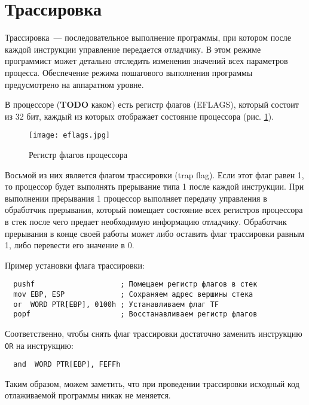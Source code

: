 
\section{Трассировка}
Трассировка~--- последовательное выполнение программы, при котором после каждой
инструкции управление передается отладчику. В этом режиме программист может
детально отследить изменения значений всех параметров процесса. Обеспечение
режима пошагового выполнения программы предусмотрено на аппаратном уровне.

В процессоре (\textbf{TODO} каком) есть регистр флагов (EFLAGS), который состоит
из 32 бит, каждый из которых отображает состояние процессора (рис.
\ref{fig:eflags}).
\begin{figure}[htpb]
  \centering
  \texttt{[image: eflags.jpg]}
  \caption{Регистр флагов процессора}
  \label{fig:eflags}
\end{figure}

Восьмой из них является флагом трассировки (trap flag). Если этот флаг равен 1,
то процессор будет выполнять прерывание типа 1 после каждой инструкции. При
выполнении прерывания 1 процессор выполняет передачу управления в обработчик
прерывания, который помещает состояние всех регистров процессора в стек после
чего предает необходимую информацию отладчику. Обработчик прерывания в конце
своей работы может либо оставить флаг трассировки равным 1, либо перевести его
значение в 0.

Пример установки флага трассировки:
\begin{verbatim}
  pushf                    ; Помещаем регистр флагов в стек
  mov EBP, ESP             ; Сохраняем адрес вершины стека
  or  WORD PTR[EBP], 0100h ; Устанавливаем флаг TF
  popf                     ; Восстанавливаем регистр флагов
\end{verbatim}
Соответственно, чтобы снять флаг трассировки достаточно заменить инструкцию
\verb!OR! на инструкцию:
\begin{verbatim}
  and  WORD PTR[EBP], FEFFh
\end{verbatim}

Таким образом, можем заметить, что при проведении трассировки исходный код
отлаживаемой программы никак не меняется.
